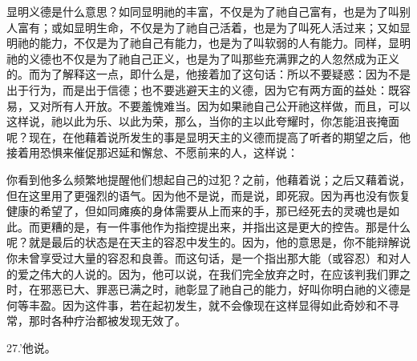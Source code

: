 显明义德是什么意思？如同显明祂的丰富，不仅是为了祂自己富有，也是为了叫别人富有；或如显明生命，不仅是为了祂自己活着，也是为了叫死人活过来；又如显明祂的能力，不仅是为了祂自己有能力，也是为了叫软弱的人有能力。同样，显明祂的义德也不仅是为了祂自己正义，也是为了叫那些充满罪之的人忽然成为正义的。而为了解释这一点，即什么是，他接着加了这句话：所以不要疑惑：因为不是出于行为，而是出于信德；也不要逃避天主的义德，因为它有两方面的益处：既容易，又对所有人开放。不要羞愧难当。因为如果祂自己公开祂这样做，而且，可以这样说，祂以此为乐、以此为荣，那么，当你的主以此夸耀时，你怎能沮丧掩面呢？现在，在他藉着说所发生的事是显明天主的义德而提高了听者的期望之后，他接着用恐惧来催促那迟延和懈怠、不愿前来的人，这样说：\par

你看到他多么频繁地提醒他们想起自己的过犯？之前，他藉着说；之后又藉着说，但在这里用了更强烈的语气。因为他不是说，而是说，即死寂。因为再也没有恢复健康的希望了，但如同瘫痪的身体需要从上而来的手，那已经死去的灵魂也是如此。而更糟的是，有一件事他作为指控提出来，并指出这是更大的控告。那是什么呢？就是最后的状态是在天主的容忍中发生的。因为，他的意思是，你不能辩解说你未曾享受过大量的容忍和良善。而这句话，是一个指出那大能（或容忍）和对人的爱之伟大的人说的。因为，他可以说，在我们完全放弃之时，在应该判我们罪之时，在邪恶已大、罪恶已满之时，祂彰显了祂自己的能力，好叫你明白祂的义德是何等丰盈。因为这件事，若在起初发生，就不会像现在这样显得如此奇妙和不寻常，那时各种疗治都被发现无效了。\par

27.'他说。\newline{}\newline{}\par

